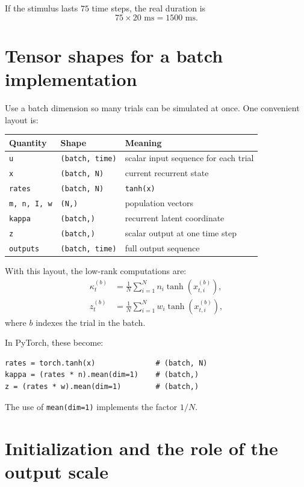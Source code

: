 \documentclass[11pt]{article}
\begin{document}
If the stimulus lasts $75$ time steps, the real duration is
\[
  75 \times 20\text{ ms} = 1500\text{ ms}.
\]

\section{Tensor shapes for a batch implementation}

Use a batch dimension so many trials can be simulated at once. One convenient
layout is:
\begin{center}
\begin{tabular}{@{}lll@{}}
\toprule
Quantity & Shape & Meaning \\
\midrule
\texttt{u} & \texttt{(batch, time)} & scalar input sequence for each trial \\
\texttt{x} & \texttt{(batch, N)} & current recurrent state \\
\texttt{rates} & \texttt{(batch, N)} & \texttt{tanh(x)} \\
\texttt{m, n, I, w} & \texttt{(N,)} & population vectors \\
\texttt{kappa} & \texttt{(batch,)} & recurrent latent coordinate \\
\texttt{z} & \texttt{(batch,)} & scalar output at one time step \\
\texttt{outputs} & \texttt{(batch, time)} & full output sequence \\
\bottomrule
\end{tabular}
\end{center}

With this layout, the low-rank computations are:
\begin{align}
  \kappa_t^{(b)}
  &=
  \frac{1}{N}\sum_{i=1}^{N} n_i \tanh(x_{t,i}^{(b)}),
  \\
  z_t^{(b)}
  &=
  \frac{1}{N}\sum_{i=1}^{N} w_i \tanh(x_{t,i}^{(b)}),
\end{align}
where $b$ indexes the trial in the batch.

In PyTorch, these become:
\begin{lstlisting}[style=python]
rates = torch.tanh(x)              # (batch, N)
kappa = (rates * n).mean(dim=1)    # (batch,)
z = (rates * w).mean(dim=1)        # (batch,)
\end{lstlisting}
The use of \texttt{mean(dim=1)} implements the factor $1/N$.

\section{Initialization and the role of the output scale}
\end{document}
